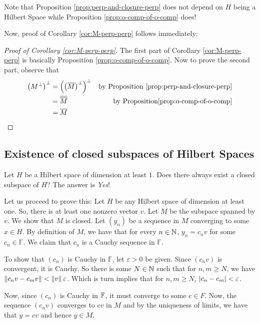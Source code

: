 Note that Proposition \ref{prop:perp-and-closure-perp} does not depend on $H$ being a Hilbert Space while Proposition \ref{prop:o-comp-of-o-comp} does!

Now, proof of Corollary \ref{cor:M-perp-perp} follows immediately:
\begin{proof}[Proof of Corollary \ref{cor:M-perp-perp}]
    The first part of Corollary \ref{cor:M-perp-perp} is basically Proposition \ref{prop:o-comp-of-o-comp}. Now to prove the second part, observe that
    \begin{align*}
    \left( M^{\perp} \right) ^{\perp} &= \left( \left( \overline M \right) ^{\perp} \right) ^{\perp} & \text{by Proposition } \ref{prop:perp-and-closure-perp} \\
    &= \overline{\overline{M}} & \text{by Proposition} \ref{prop:o-comp-of-o-comp} \\
    &= \overline M
    \end{align*}
\end{proof}

\subsection{Existence of closed subspaces of Hilbert Spaces}
Let $H$ be a Hilbert space of dimension at least $1$. Does there always exist a closed subspace of $H$? The answer is \textit{Yes}!

Let us proceed to prove this: Let $H$ be any Hilbert space of dimension at least one. So, there is at least one nonzero vector $v$. Let $M$ be the subspace spanned by $v$. We show that $M$ is closed. Let $\left( y_{n} \right)$ be a sequence in $M$ converging to some $x \in H$.
By definition of $M$, we have that for every $n\in \mathbb N$, $y_{n} = c_{n}v$ for some $c_n \in \mathbb F$. We claim that $c_{n}$ is a Cauchy sequence in $\mathbb F$.

To show that $\left( c_{n} \right)$ is Cauchy in $\mathbb F$, let $\varepsilon > 0$ be given. Since $\left( c_{n} v \right)$ is convergent, it is Cauchy. So there is some $N \in \mathbb N$ such that for $n,m \ge N$, we have $\left\lVert c_n v - c_{m} v \right\rVert < \left\lVert v \right\rVert \varepsilon$. Which is turn implies that for $n,m \ge N$, $\left\lvert c_{n} - c_{m} \right\rvert < \varepsilon$.

Now, since $\left( c_{n} \right)$ is Cauchy in $\mathbb F$, it must converge to some $c\in F$. Now, the sequence $\left( c_{n} v \right)$ converges to $cv$ in $M$ and by the uniqueness of limits, we have that $y=cv$ and hence $y\in M$.

